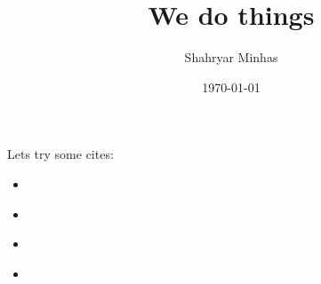 \documentclass[12pt,onesided]{amsart}
\title{We do things}
\author[Minhas]{Shahryar Minhas}
\date{\today}
\begin{document}
\maketitle\thispagestyle{empty}

Lets try some cites: 

\begin{itemize}
	\item \citep{mckelvey:zaviona:1975}
	\item \citet{mckelvey:zaviona:1975}
	\item \citet{gers:etal:1999}
	\item \citep{gers:etal:1999}
\end{itemize}

\newpage

\clearpage
% 


\newpage
\end{document}

